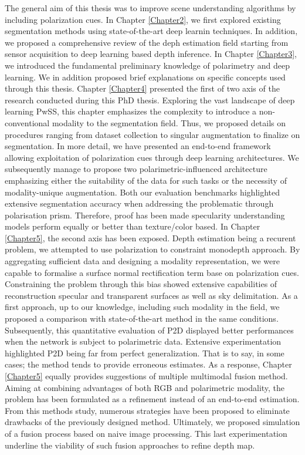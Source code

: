 The general aim of this thesis was to improve scene understanding algorithms by including polarization cues. In Chapter \ref{Chapter2}, we first explored existing segmentation methods using state-of-the-art deep learnin techniques. In addition, we proposed a comprehensive review of the deph estimation field starting from sensor acquisition to deep learning based depth inference.
In Chapter \ref{Chapter3}, we introduced the fundamental preliminary knowledge of polarimetry and deep learning. We in addition proposed brief explanations on specific concepts used through this thesis.
Chapter \ref{Chapter4} presented the first of two axis of the research conducted during this PhD thesis. Exploring the vast landscape of deep learning PwSS, this chapter emphasizes the complexity to introduce a non-conventional modality to the segmentation field. Thus, we proposed details on procedures ranging from dataset collection to singular augmentation to finalize on segmentation. In more detail, we have presented an end-to-end framework allowing exploitation of polarization cues through deep learning architectures. We subsequently manage to propose two polarimetric-influenced architecture emphasizing either the suitability of the data for such tasks or the necessity of modality-unique augmentation. Both our evaluation benchmarks highlighted extensive segmentation accuracy when addressing the problematic through polarisation prism. Therefore, proof has been made specularity understanding models perform equally or better than texture/color based.
In Chapter \ref{Chapter5}, the second axis has been exposed. Depth estimation being a recurent problem, we attempted to use polarization to constraint monodepth approach. By aggregating sufficient data and designing a modality representation, we were capable to formalise a surface normal rectification term base on polarization cues. Constraining the problem through this bias showed extensive capabilities of reconstruction specular and transparent surfaces as well as sky delimitation. As a first approach, up to our knowledge, including such modality in the field, we proposed a comparison with state-of-the-art method in the same conditions. Subsequently, this quantitative evaluation of P2D displayed better performances when the network is subject to polarimetric data. 
Extensive experimentation highlighted P2D being far from perfect generalization. That is to say, in some cases; the method tends to provide erroneous estimates. As a response, Chapter \ref{Chapter5} equally provides suggestions of multiple multimodal fusion method. Aiming at combining advantages of both RGB and polarimetric modality, the problem has been formulated as a refinement instead of an end-to-end estimation. From this methods study, numerous strategies have been proposed to eliminate drawbacks of the previously designed method. Ultimately, we proposed simulation of a fusion process based on naive image processing. This last experimentation underline the viability of such fusion approaches to refine depth map. 


